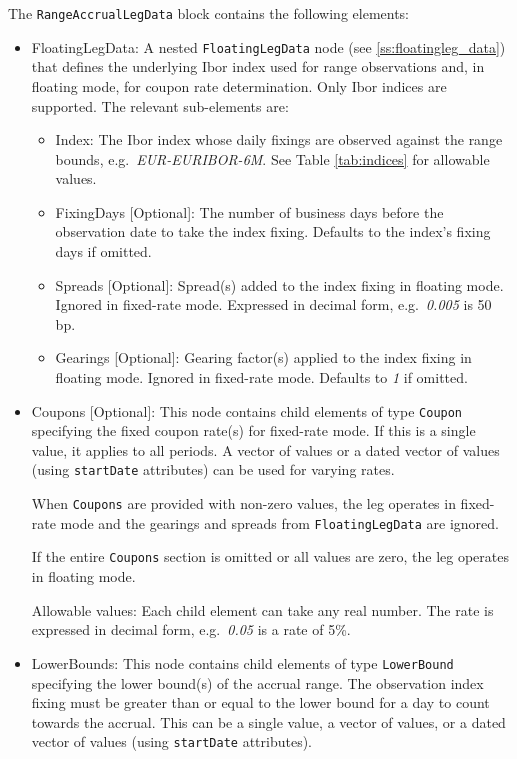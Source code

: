 The \lstinline!RangeAccrualLegData! block contains the following elements:

\begin{itemize}

\item FloatingLegData: A nested \lstinline!FloatingLegData! node (see \ref{ss:floatingleg_data}) that defines the
  underlying Ibor index used for range observations and, in floating mode, for coupon rate determination. Only Ibor
  indices are supported. The relevant sub-elements are:

  \begin{itemize}
  \item Index: The Ibor index whose daily fixings are observed against the range bounds, e.g.\ \emph{EUR-EURIBOR-6M}.
    See Table \ref{tab:indices} for allowable values.
  \item FixingDays [Optional]: The number of business days before the observation date to take the index fixing.
    Defaults to the index's fixing days if omitted.
  \item Spreads [Optional]: Spread(s) added to the index fixing in floating mode. Ignored in fixed-rate mode. Expressed
    in decimal form, e.g.\ \emph{0.005} is 50 bp.
  \item Gearings [Optional]: Gearing factor(s) applied to the index fixing in floating mode. Ignored in fixed-rate
    mode. Defaults to \emph{1} if omitted.
  \end{itemize}

\item Coupons [Optional]: This node contains child elements of type \lstinline!Coupon! specifying the fixed coupon
  rate(s) for fixed-rate mode. If this is a single value, it applies to all periods. A vector of values or a dated
  vector of values (using \lstinline!startDate! attributes) can be used for varying rates.

  When \lstinline!Coupons! are provided with non-zero values, the leg operates in fixed-rate mode and the gearings and
  spreads from \lstinline!FloatingLegData! are ignored.

  If the entire \lstinline!Coupons! section is omitted or all values are zero, the leg operates in floating mode.

  Allowable values: Each child element can take any real number. The rate is expressed in decimal form, e.g.\
  \emph{0.05} is a rate of 5\%.

\item LowerBounds: This node contains child elements of type \lstinline!LowerBound! specifying the lower bound(s) of
  the accrual range. The observation index fixing must be greater than or equal to the lower bound for a day to count
  towards the accrual. This can be a single value, a vector of values, or a dated vector of values (using
  \lstinline!startDate! attributes).


\end{itemize}
